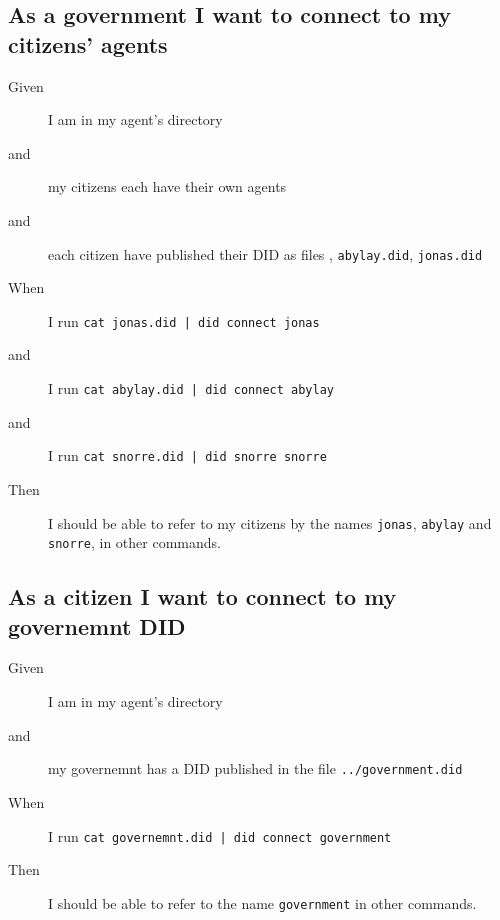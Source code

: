 \subsection{As a government I want to connect to my citizens' agents}
\begin{description}\begin{description}
    \item[Given] I am in my agent's directory
    \item[and] my citizens each have their own agents
    \item[and] each citizen have published their DID as files , \texttt{abylay.did}, \texttt{jonas.did}
    \item[When] I run \texttt{cat jonas.did | did connect jonas}
    \item[and] I run \texttt{cat abylay.did | did connect abylay}
    \item[and] I run \texttt{cat snorre.did | did snorre snorre}
    \item[Then] I should be able to refer to my citizens by the names \texttt{jonas}, \texttt{abylay} and \texttt{snorre}, in other commands.
\end{description}\end{description}



\subsection{As a citizen I want to connect to my governemnt DID}
\begin{description}\begin{description}
    \item[Given] I am in my agent's directory
    \item[and] my governemnt has a DID published in the file \texttt{../government.did}
    \item[When] I run \texttt{cat governemnt.did | did connect government}
    \item[Then] I should be able to refer to the name \texttt{government} in other commands.
\end{description}\end{description}



